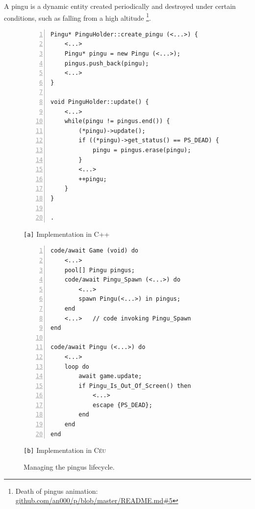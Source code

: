\documentclass{vgtc}                          %
\newcommand{\CEU}{\textsc{C\'{e}u}\xspace}
\newcommand{\code}[1] {{\small{\texttt{#1}}}}
\newcommand{\ax}{\code{[a]}\xspace}
\newcommand{\bx}{\code{[b]}\xspace}
\begin{document}

A pingu is a dynamic entity created periodically and destroyed under certain
conditions, such as falling from a high altitude%
\footnote{Death of pingus animation: \url{github.com/an000/p/blob/master/README.md#5} }.
%

\begin{figure}[t]
\begin{minipage}[t]{0.50\linewidth}
\begin{lstlisting}[numbers=left,xleftmargin=3em]
Pingu* PinguHolder::create_pingu (<...>) {
    <...>
    Pingu* pingu = new Pingu (<...>);
    pingus.push_back(pingu);
    <...>
}

void PinguHolder::update() {
    <...>
    while(pingu != pingus.end()) {
        (*pingu)->update();
        if ((*pingu)->get_status() == PS_DEAD) {
            pingu = pingus.erase(pingu);
        }
        <...>
        ++pingu;
    }
}

.
\end{lstlisting}
\centering\small{\ax Implementation in C++}
\end{minipage}
%
\begin{minipage}[t]{0.50\linewidth}
\begin{lstlisting}[numbers=left,xleftmargin=3em]
code/await Game (void) do
    <...>
    pool[] Pingu pingus;
    code/await Pingu_Spawn (<...>) do
        <...>
        spawn Pingu(<...>) in pingus;
    end
    <...>   // code invoking Pingu_Spawn
end

code/await Pingu (<...>) do
    <...>
    loop do
        await game.update;
        if Pingu_Is_Out_Of_Screen() then
            <...>
            escape {PS_DEAD};
        end
    end
end
\end{lstlisting}
\centering\small{\bx Implementation in \CEU}
\end{minipage}
\caption{ Managing the pingus lifecycle.
\label{lst.pingus}
}
\end{figure}
\end{document}
